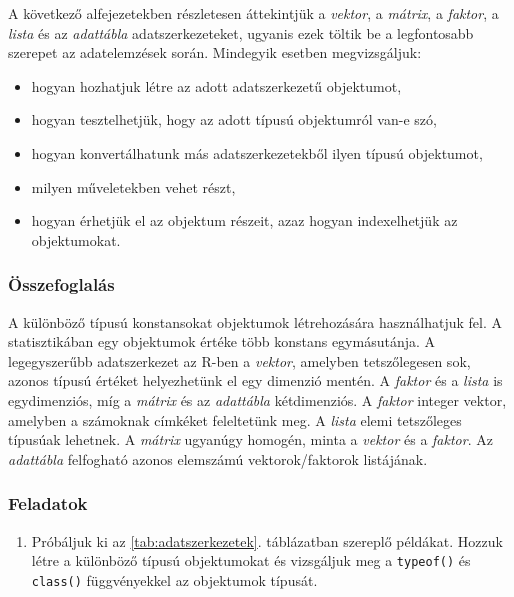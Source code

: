 \documentclass[
]{book}
\makeatletter
\providecommand{\tightlist}{%
  \setlength{\itemsep}{0pt}\setlength{\parskip}{0pt}}
\newenvironment{kframe}{%
\medskip{}
\setlength{\fboxsep}{.8em}
 \def\at@end@of@kframe{}%
 \ifinner\ifhmode%
  \def\at@end@of@kframe{\end{minipage}}%
  \begin{minipage}{\columnwidth}%
 \fi\fi%
 \def\FrameCommand##1{\hskip\@totalleftmargin \hskip-\fboxsep
 \colorbox{shadecolor}{##1}\hskip-\fboxsep
     \hskip-\linewidth \hskip-\@totalleftmargin \hskip\columnwidth}%
 \MakeFramed {\advance\hsize-\width
   \@totalleftmargin\z@ \linewidth\hsize
   \@setminipage}}%
 {\par\unskip\endMakeFramed%
 \at@end@of@kframe}
\newenvironment{rmdblock}[1]
  {
  \begin{itemize}
  \renewcommand{\labelitemi}{
    \raisebox{-.7\height}[0pt][0pt]{
      {\setkeys{Gin}{width=3em,keepaspectratio}\texttt{[image: images/\#1]}}
    }
  }
  \setlength{\fboxsep}{1em}
  \begin{kframe}
  \item
  }
  {
  \end{kframe}
  \end{itemize}
  }
\newenvironment{rmdsummary}
  {\begin{rmdblock}{summary}}
  {\end{rmdblock}}
\newenvironment{rmdexercise}
  {\begin{rmdblock}{exercise}}
  {\end{rmdblock}}
\makeatother
\begin{document}
A következő alfejezetekben részletesen áttekintjük a \emph{vektor}, a \emph{mátrix}, a \emph{faktor}, a \emph{lista} és az \emph{adattábla} adatszerkezeteket, ugyanis ezek töltik be a legfontosabb szerepet az adatelemzések során. Mindegyik esetben megvizsgáljuk:

\begin{itemize}
\tightlist
\item
  hogyan hozhatjuk létre az adott adatszerkezetű objektumot,
\item
  hogyan tesztelhetjük, hogy az adott típusú objektumról van-e szó,
\item
  hogyan konvertálhatunk más adatszerkezetekből ilyen típusú objektumot,
\item
  milyen műveletekben vehet részt,
\item
  hogyan érhetjük el az objektum részeit, azaz hogyan indexelhetjük az objektumokat.
\end{itemize}

\hypertarget{az-r-nyelv-4-summary}{%
\subsubsection{Összefoglalás}\label{az-r-nyelv-4-summary}}

\begin{rmdsummary}
A különböző típusú konstansokat objektumok létrehozására használhatjuk
fel. A statisztikában egy objektumok értéke több konstans egymásutánja.
A legegyszerűbb adatszerkezet az R-ben a \emph{vektor}, amelyben
tetszőlegesen sok, azonos típusú értéket helyezhetünk el egy dimenzió
mentén. A \emph{faktor} és a \emph{lista} is egydimenziós, míg a
\emph{mátrix} és az \emph{adattábla} kétdimenziós. A \emph{faktor}
integer vektor, amelyben a számoknak címkéket feleltetünk meg. A
\emph{lista} elemi tetszőleges típusúak lehetnek. A \emph{mátrix}
ugyanúgy homogén, minta a \emph{vektor} és a \emph{faktor}. Az
\emph{adattábla} felfogható azonos elemszámú vektorok/faktorok
listájának.
\end{rmdsummary}

\hypertarget{az-r-nyelv-4-exercise}{%
\subsubsection{Feladatok}\label{az-r-nyelv-4-exercise}}

\begin{rmdexercise}
\begin{enumerate}
\def\labelenumi{\arabic{enumi}.}
\tightlist
\item
  Próbáljuk ki az \ref{tab:adatszerkezetek}. táblázatban szereplő példákat. Hozzuk létre a különböző típusú objektumokat és vizsgáljuk meg a \texttt{typeof()} és \texttt{class()} függvényekkel az objektumok típusát.
\end{enumerate}
\end{rmdexercise}
\end{document}
